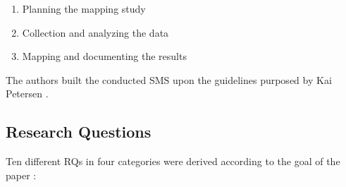 \begin{enumerate}
    \item Planning the mapping study
    \item Collection and analyzing the data
    \item Mapping and documenting the results
\end{enumerate}

The authors built the conducted SMS upon the guidelines purposed by Kai Petersen \cite{petersen:SMS}.

\subsection{Research Questions}

Ten different RQs in four categories were derived 
according to the goal of the paper \cite{waseem:SMSMSADevOps}:


